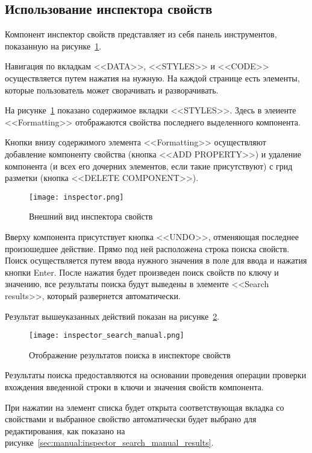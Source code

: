 \subsection{Использование инспектора свойств}
\label{sec:manual:inspector_manual}

Компонент инспектор свойств представляет из себя панель инструментов, показанную на рисунке~\ref{sec:manual:inspector}.

Навигация по вкладкам <<DATA>>, <<STYLES>> и <<CODE>> осуществляется путем нажатия на нужную. На каждой странице есть элементы, которые пользователь может сворачивать и разворачивать.

На рисунке~\ref{sec:manual:inspector} показано содержимое вкладки <<STYLES>>. Здесь в элеиенте <<Formatting>> отображаются свойства последнего выделенного компонента.

Кнопки внизу содержимого элемента <<Formatting>> осуществляют добавление компоненту свойства (кнопка <<ADD PROPERTY>>) и удаление компонента (и всех его дочерних элементов, если такие присутствуют) с грид разметки (кнопка <<DELETE COMPONENT>>).

\begin{figure}[ht]
  \centering
    \texttt{[image: inspector.png]}
    \caption{Внешний вид инспектора свойств}
    \label{sec:manual:inspector}
\end{figure}
  
Вверху компонента присутствует кнопка <<UNDO>>, отменяющая последнее произошедшее действие. Прямо под ней расположена строка поиска свойств. Поиск осуществляется путем ввода нужного значения в поле для ввода и нажатия кнопки Enter. После нажатия будет произведен поиск свойств по ключу и значению, все результаты поиска будут выведены в элементе <<Search results>>, который развернется автоматически.

Результат вышеуказанных действий показан на рисунке~\ref{sec:manual:inspector_search_manual}.\pagebreak

\begin{figure}[ht]
  \centering
    \texttt{[image: inspector\_search\_manual.png]}
    \caption{Отображение результатов поиска в инспекторе свойств}
    \label{sec:manual:inspector_search_manual}
\end{figure}

Результаты поиска предоставляются на основании проведения операции проверки вхождения введенной строки в ключи и значения свойств компонента. 

При нажатии на элемент списка будет открыта соответствующая вкладка со свойствами и выбранное свойство автоматически будет выбрано для редактирования, как показано на рисунке~\ref{sec:manual:inspector_search_manual_results}.\pagebreak

